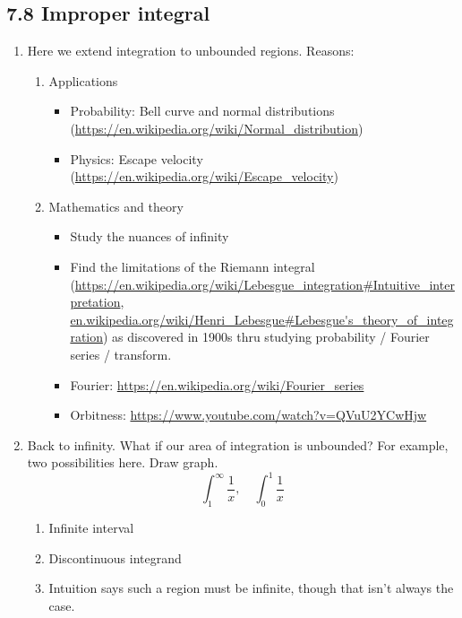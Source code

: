 \documentclass{article}
\begin{document}
\subsection{7.8 Improper integral}
\begin{enumerate}


\item Here we extend integration to unbounded regions. Reasons:
\begin{enumerate}
\item Applications
\begin{itemize}
\item Probability: Bell curve and normal distributions (\url{https://en.wikipedia.org/wiki/Normal_distribution})
\item Physics: Escape velocity (\url{https://en.wikipedia.org/wiki/Escape_velocity})
\end{itemize}
\item Mathematics and theory
\begin{itemize}
\item Study the nuances of infinity
\item Find the limitations of the Riemann integral (\url{https://en.wikipedia.org/wiki/Lebesgue_integration#Intuitive_interpretation}, \url{en.wikipedia.org/wiki/Henri_Lebesgue#Lebesgue's_theory_of_integration}) as discovered in 1900s thru studying probability / Fourier series / transform.
\item Fourier: \url{https://en.wikipedia.org/wiki/Fourier_series}
\item Orbitness: \url{https://www.youtube.com/watch?v=QVuU2YCwHjw}
\end{itemize}
\end{enumerate}

\item Back to infinity. What if our area of integration is unbounded? For example, two possibilities here. Draw graph.
$$
\int_1^\infty \frac{1}{x}, \quad \int_0^1 \frac{1}{x}
$$
\begin{enumerate}
\item Infinite interval
\item Discontinuous integrand
\item Intuition says such a region must be infinite, though that isn't always the case.
\end{enumerate}


\end{enumerate}
\end{document}

